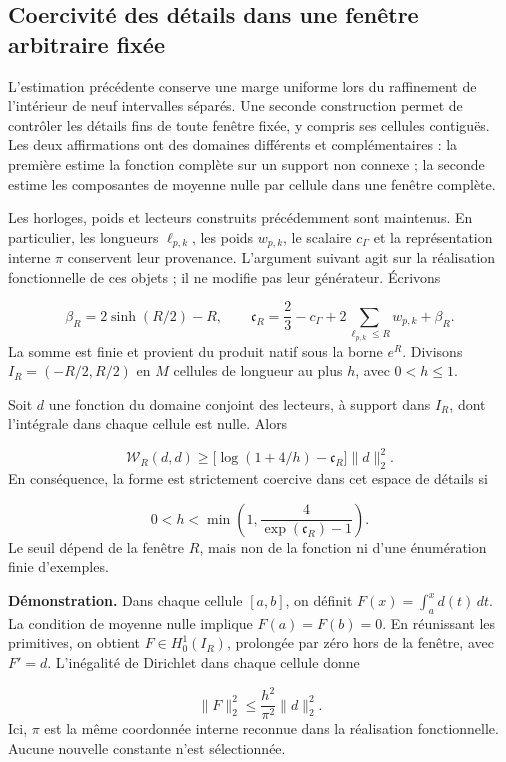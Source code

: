 \subsection{Coercivité des détails dans une fenêtre arbitraire fixée}
\label{rz:detalles}
L’estimation précédente conserve une marge uniforme lors du raffinement de l’intérieur de neuf intervalles séparés. Une seconde construction permet de contrôler les détails fins de toute fenêtre fixée, y compris ses cellules contiguës. Les deux affirmations ont des domaines différents et complémentaires : la première estime la fonction complète sur un support non connexe ; la seconde estime les composantes de moyenne nulle par cellule dans une fenêtre complète.

Les horloges, poids et lecteurs construits précédemment sont maintenus. En particulier, les longueurs \(\ell_{p,k}\), les poids \(w_{p,k}\), le scalaire \(c_\Gamma\) et la représentation interne \(\pi\) conservent leur provenance. L'argument suivant agit sur la réalisation fonctionnelle de ces objets ; il ne modifie pas leur générateur. Écrivons

\[
\beta_R=2\sinh(R/2)-R,\qquad
\mathfrak c_R=\frac23-c_\Gamma+
2\sum_{\ell_{p,k}\leq R}w_{p,k}+\beta_R.
\]
La somme est finie et provient du produit natif sous la borne \(e^R\). Divisons \(I_R=(-R/2,R/2)\) en \(M\) cellules de longueur au plus \(h\), avec \(0<h\leq1\).

Soit \(d\) une fonction du domaine conjoint des lecteurs, à support dans \(I_R\), dont l'intégrale dans chaque cellule est nulle. Alors

\[
\boxed{\mathscr W_R(d,d)\geq
\bigl[\log(1+4/h)-\mathfrak c_R\bigr]\|d\|_2^2.}
\]
En conséquence, la forme est strictement coercive dans cet espace de détails si

\[
0<h<\min\left(1,\frac4{\exp(\mathfrak c_R)-1}\right).
\]
Le seuil dépend de la fenêtre \(R\), mais non de la fonction ni d’une énumération finie d’exemples.

\textbf{Démonstration.} Dans chaque cellule \([a,b]\), on définit \(F(x)=\int_a^x d(t)\,dt\). La condition de moyenne nulle implique \(F(a)=F(b)=0\). En réunissant les primitives, on obtient \(F\in H_0^1(I_R)\), prolongée par zéro hors de la fenêtre, avec \(F'=d\). L’inégalité de Dirichlet dans chaque cellule donne

\[
\|F\|_2^2\leq\frac{h^2}{\pi^2}\|d\|_2^2.
\]
Ici, \(\pi\) est la même coordonnée interne reconnue dans la réalisation fonctionnelle. Aucune nouvelle constante n'est sélectionnée.

